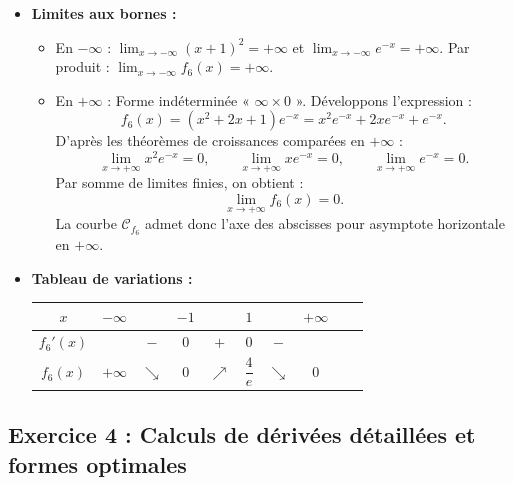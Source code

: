 \documentclass[11pt,a4paper]{article}
\begin{document}
\begin{correctionbox}[Exercice 3]
\begin{itemize}
\begin{itemize}
        \item En $x = 1$, la fonction admet un \textbf{maximum local} qui vaut $f_6(1) = (1+1)^2 e^{-1} = 4e^{-1} = \dfrac{4}{e} \approx 1{,}4715$.
    \end{itemize}
    \item \textbf{Limites aux bornes :}
    \begin{itemize}
        \item En $-\infty$ : $\lim_{x \to -\infty} (x+1)^2 = +\infty$ et $\lim_{x \to -\infty} e^{-x} = +\infty$. Par produit : $\lim_{x \to -\infty} f_6(x) = +\infty$.
        \item En $+\infty$ : Forme indéterminée « $\infty \times 0$ ». Développons l'expression :
        \[
        f_6(x) = (x^2 + 2x + 1)e^{-x} = x^2 e^{-x} + 2x e^{-x} + e^{-x}.
        \]
        D'après les théorèmes de croissances comparées en $+\infty$ :
        \[
        \lim_{x \to +\infty} x^2 e^{-x} = 0, \qquad \lim_{x \to +\infty} x e^{-x} = 0, \qquad \lim_{x \to +\infty} e^{-x} = 0.
        \]
        Par somme de limites finies, on obtient :
        \[
        \lim_{x \to +\infty} f_6(x) = 0.
        \]
        La courbe $\mathcal{C}_{f_6}$ admet donc l'axe des abscisses pour asymptote horizontale en $+\infty$.
    \end{itemize}
    \item \textbf{Tableau de variations :}
    \begin{center}
    \begin{tabular}{|c|lcccccccr|}
    \hline
    $x$ & $-\infty$ & & $-1$ & & $1$ & & $+\infty$ \\
    \hline
    $f_6'(x)$ & & $-$ & $0$ & $+$ & $0$ & $-$ & \\
    \hline
    $f_6(x)$ & $+\infty$ & $\searrow$ & $0$ & $\nearrow$ & $\dfrac{4}{e}$ & $\searrow$ & $0$ \\
    \hline
    \end{tabular}
    \end{center}
\end{itemize}
\end{correctionbox}

\subsection*{Exercice 4 : Calculs de dérivées détaillées et formes optimales}
\end{document}
